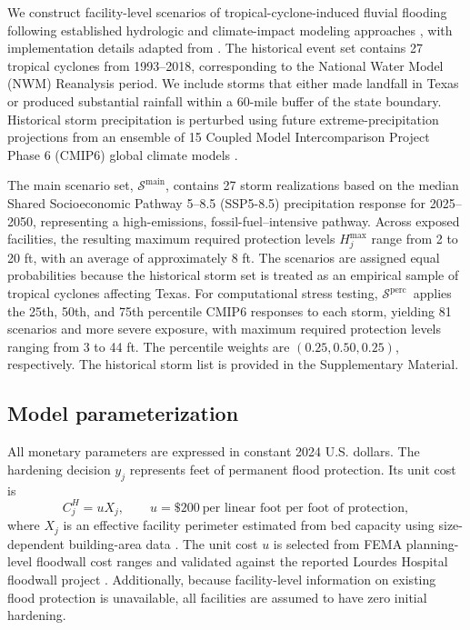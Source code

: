 \documentclass[preprint,11pt,authoryear]{elsarticle}
\newcommand{\Smain}{\ensuremath{\mathcal{S}^{\mathrm{main}}}}
\newcommand{\Spercentile}{\ensuremath{\mathcal{S}^{\mathrm{perc}}}}
\begin{document}
We construct facility-level scenarios of tropical-cyclone-induced fluvial
flooding following established hydrologic and climate-impact modeling
approaches
\citep{johnson_integrated_2019,kim_hurricane_2021,
maraun_statistical_2018}, with implementation details
adapted from \citet{Tabassum2024Dissertation}. The historical event set contains
27 tropical cyclones from 1993--2018, corresponding to the National Water Model (NWM) Reanalysis
period. We include storms that either made landfall in Texas or produced
substantial rainfall within a 60-mile buffer of the state boundary. Historical
storm precipitation is perturbed using future extreme-precipitation projections
from an ensemble of 15 Coupled Model Intercomparison Project Phase 6 (CMIP6) global climate models
\citep{ONeill2016SSP}.

The main scenario set, \Smain, contains 27 storm realizations based on the
median Shared Socioeconomic Pathway 5–8.5 (SSP5-8.5) precipitation response for 2025--2050, representing a
high-emissions, fossil-fuel--intensive pathway. Across exposed facilities,
the resulting maximum required protection levels $H_j^{\max}$ range from 2 to 20 ft, with an average of approximately 8 ft. The scenarios are assigned equal probabilities because the historical storm set is treated as an empirical sample of tropical cyclones affecting Texas. For computational stress testing,
\Spercentile\ applies the 25th, 50th, and 75th percentile CMIP6 responses to
each storm, yielding 81 scenarios and more severe exposure, with maximum required protection levels ranging from 3 to 44 ft. The percentile weights are
$(0.25,0.50,0.25)$, respectively. The historical storm list is provided in the Supplementary Material.

\subsection{Model parameterization}
\label{sec:case_parameterization}

All monetary parameters are expressed in constant
2024 U.S. dollars. The hardening decision $y_j$ represents feet of permanent flood protection.
Its unit cost is
\begin{equation*}
C_j^H=uX_j,
\qquad
u=\$200
\ \text{per linear foot per foot of protection},
\end{equation*}
where $X_j$ is an effective facility perimeter estimated from bed capacity
using size-dependent building-area data \citep{definitivehc_sqft}. The unit
cost $u$ is selected from FEMA planning-level floodwall cost ranges and
validated against the reported Lourdes Hospital floodwall project
\citep{SCCOG_critical_facilities,fema_advanced_2012}. Additionally, because facility-level information on existing flood protection is unavailable, all facilities are assumed to have zero initial hardening.
\end{document}
